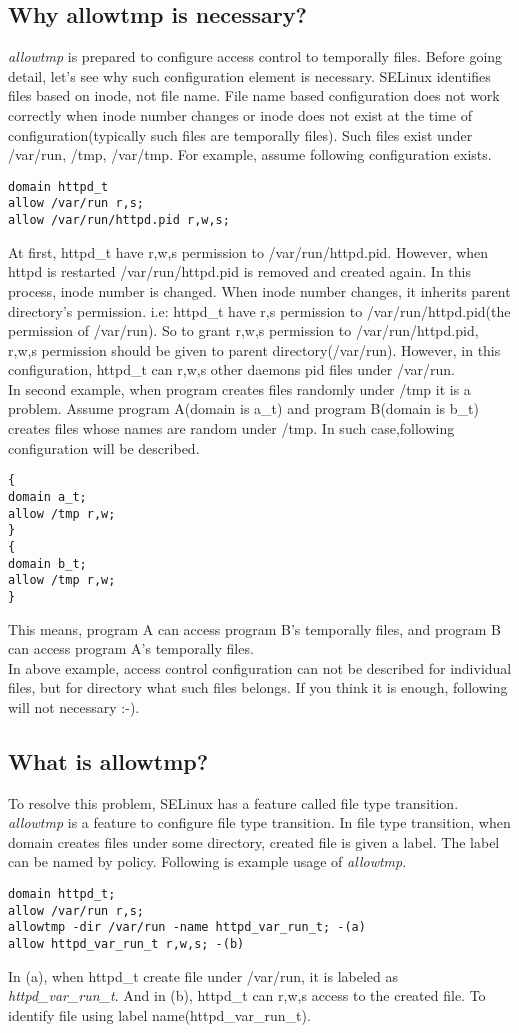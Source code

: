 \documentclass{article}
\begin{document}
\subsection{Why allowtmp is necessary?}
{\it allowtmp} is prepared to configure access control to temporally
files.
Before going detail, let's see why such configuration element is necessary.
SELinux identifies files based on inode, not file name. File name based
configuration does not work correctly when inode number changes or inode
does not exist at the time of configuration(typically such files are
temporally files).
Such files exist under  /var/run, /tmp, /var/tmp.
For example, assume following configuration exists.\\
\begin{verbatim}
domain httpd_t
allow /var/run r,s;
allow /var/run/httpd.pid r,w,s;
\end{verbatim}
At first, httpd\_t have r,w,s permission to /var/run/httpd.pid.
However, when httpd is restarted /var/run/httpd.pid is removed and
created again. In this process, inode number is changed. When inode
number changes, it inherits parent directory's permission. i.e:
 httpd\_t have r,s permission to /var/run/httpd.pid(the permission of
 /var/run). So to grant r,w,s permission to /var/run/httpd.pid, r,w,s
 permission should be given to parent directory(/var/run).
However, in this configuration, httpd\_t can r,w,s other daemons pid
files under /var/run. 
\\
In second example, when program creates files randomly under /tmp it is
a problem. Assume program  A(domain is a\_t) and program B(domain is
b\_t) creates files whose names are random under /tmp. In such
case,following configuration will be described.
\begin{verbatim}
{
domain a_t;
allow /tmp r,w;
}
{
domain b_t;
allow /tmp r,w;
}
\end{verbatim}
This means, program A can access program B's temporally files, and
program B can access program A's temporally files. \\
In above example, access control configuration can not be described for
individual files, but for directory what such files belongs.
If you think it is enough, following will not necessary :-).\\

\subsection{What is allowtmp?}
To resolve this problem, SELinux has a feature called file type
transition. {\it allowtmp } is a feature to configure file type
transition.
In file type transition, when domain creates files under some directory,
created file is given a label. The label can be named by policy.
Following is example  usage of {\it allowtmp}.
\begin{verbatim}
domain httpd_t;
allow /var/run r,s;
allowtmp -dir /var/run -name httpd_var_run_t; -(a)
allow httpd_var_run_t r,w,s; -(b)
\end{verbatim}
In (a), when httpd\_t create file under /var/run, it is labeled as {\it
httpd\_var\_run\_t}. And in (b), httpd\_t can r,w,s access to the
created file. To identify file using label name(httpd\_var\_run\_t).
\end{document}
